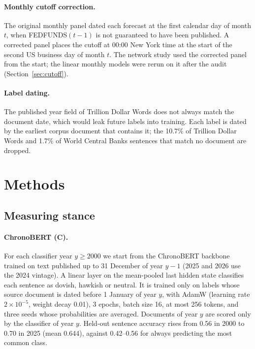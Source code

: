 \documentclass[11pt]{article}
\begin{document}
\paragraph{Monthly cutoff correction.}
The original monthly panel dated each forecast at the first calendar day of month $t$, when FEDFUNDS$(t-1)$ is
not guaranteed to have been published. A corrected panel places the cutoff at 00:00 New York time at the start of
the second US business day of month $t$. The network study used the corrected panel from the start; the linear
monthly models were rerun on it after the audit (Section~\ref{sec:cutoff}).

\paragraph{Label dating.}
The published year field of Trillion Dollar Words does not always match the document date, which would leak
future labels into training. Each label is dated by the earliest corpus document that contains it; the 10.7\% of
Trillion Dollar Words and 1.7\% of World Central Banks sentences that match no document are dropped.

\section{Methods}\label{sec:methods}

\subsection{Measuring stance}\label{sec:stance}

\paragraph{ChronoBERT (C).}
For each classifier year $y\geq 2000$ we start from the ChronoBERT backbone trained on text published up to
31 December of year $y-1$ (2025 and 2026 use the 2024 vintage). A linear layer on the mean-pooled last hidden state
classifies each sentence as dovish, hawkish or neutral. It is trained only on labels whose source document is dated
before 1 January of year $y$, with AdamW (learning rate $2\times10^{-5}$, weight decay 0.01), 3 epochs, batch size
16, at most 256 tokens, and three seeds whose probabilities are averaged. Documents of year $y$ are scored only by
the classifier of year $y$. Held-out sentence accuracy rises from 0.56 in 2000 to 0.70 in 2025 (mean 0.644), against
0.42--0.56 for always predicting the most common class.
\end{document}
